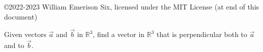 \documentclass[12pt]{article}
\newcommand{\R}{\mathbb{R}}
\newenvironment{problem}[2][Problem]{\begin{trivlist}
\item[\hskip \labelsep {\bfseries #1}\hskip \labelsep {\bfseries #2.}]}{\end{trivlist}}
\begin{document}

\rhead{\today}


\copyright 2022-2023 William Emerison Six, licensed under the MIT License (at end of this document)

\begin{problem}{1} %

  Given vectors $\vec{a}$ and $\vec{b}$ in $\R^3$, find a vector in $\R^3$ that is perpendicular both to $\vec{a}$ and to $\vec{b}$.
\end{problem}
\end{document}
